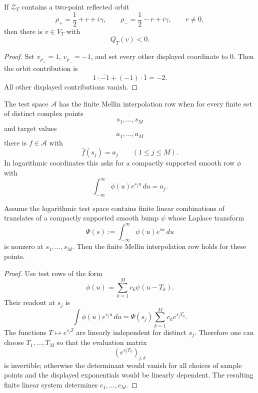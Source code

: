 \begin{corollary}
\label{cor:rh-finite-mirror-negative-value-row}
If $\mathcal Z_T$ contains a two-point reflected orbit
$$
\rho_+=\frac12+r+i\gamma,
\qquad
\rho_-=\frac12-r+i\gamma,
\qquad
r\ne0,
$$
then there is $v\in V_T$ with
$$
Q_T(v)<0.
$$
\end{corollary}

\begin{proof}
Set $v_{\rho_+}=1$, $v_{\rho_-}=-1$, and set every other displayed
coordinate to $0$.  Then the orbit contribution is
$$
1\cdot\overline{-1}+(-1)\cdot\overline{1}=-2.
$$
All other displayed contributions vanish.
\end{proof}

\begin{definition}
\label{def:rh-finite-mellin-interpolation-row}
The test space $\mathcal A$ has the finite Mellin interpolation row when
for every finite set of distinct complex points
$$
s_1,\ldots,s_M
$$
and target values
$$
a_1,\ldots,a_M
$$
there is $f\in\mathcal A$ with
$$
\widehat f(s_j)=a_j
\qquad
(1\le j\le M).
$$
In logarithmic coordinates this asks for a compactly supported smooth
row $\phi$ with
$$
\int_{-\infty}^{\infty}\phi(u)e^{s_j u}\,du=a_j.
$$
\end{definition}

\begin{lemma}
\label{lem:rh-translate-packets-give-finite-mellin-interpolation}
Assume the logarithmic test space contains finite linear combinations of
translates of a compactly supported smooth bump $\psi$ whose Laplace
transform
$$
\Psi(s):=\int_{-\infty}^{\infty}\psi(u)e^{su}\,du
$$
is nonzero at $s_1,\ldots,s_M$.  Then the finite Mellin interpolation
row holds for these points.
\end{lemma}

\begin{proof}
Use test rows of the form
$$
\phi(u)=\sum_{k=1}^M c_k\psi(u-T_k).
$$
Their readout at $s_j$ is
$$
\int \phi(u)e^{s_j u}\,du
=
\Psi(s_j)\sum_{k=1}^M c_k e^{s_jT_k}.
$$
The functions $T\mapsto e^{s_jT}$ are linearly independent for distinct
$s_j$.  Therefore one can choose $T_1,\ldots,T_M$ so that the evaluation
matrix
$$
\left(e^{s_jT_k}\right)_{j,k}
$$
is invertible; otherwise the determinant would vanish for all choices
of sample points and the displayed exponentials would be linearly
dependent.  The resulting finite linear system determines
$c_1,\ldots,c_M$.
\end{proof}


